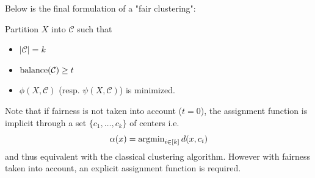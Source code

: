 \newpage
Below is the final formulation of a "fair clustering":

\begin{problem}
Partition $X$ into $\mathcal{C}$ such that
	\begin{itemize}
		\item $|\mathcal{C}| = k$
		\item $\operatorname{balance}(\mathcal{C}) \geq t$
		\item $\phi(X, \mathcal{C})$ (resp. $\psi(X, \mathcal{C})$) is minimized.
	\end{itemize}
\end{problem}

Note that if fairness is not taken into account ($t = 0$), the assignment function is implicit through a set $\{c_1, \dots, c_k\}$ of centers i.e.
	$$\alpha(x) = \operatorname{argmin}_{i \in [k]} d(x, c_i)$$
and thus equivalent with the classical clustering algorithm.
However with fairness taken into account, an explicit assignment function is required.
